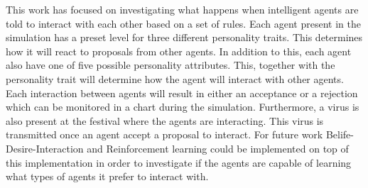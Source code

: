 \documentclass[a4paper,10pt]{article}
\begin{document}
This work has focused on investigating what happens when intelligent agents are told to interact with each other based on a set of rules. Each agent present in the simulation has a preset level for three different personality traits. This determines how it will react to proposals from other agents. In addition to this, each agent also have one of five possible personality attributes. This, together with the personality trait will determine how the agent will interact with other agents. Each interaction between agents will result in either an acceptance or a rejection which can be monitored in a chart during the simulation. Furthermore, a virus is also present at the festival where the agents are interacting. This virus is transmitted once an agent accept a proposal to interact. For future work Belife-Desire-Interaction and Reinforcement learning could be implemented on top of this implementation in order to investigate if the agents are capable of learning what types of agents it prefer to interact with. 
\end{document}
